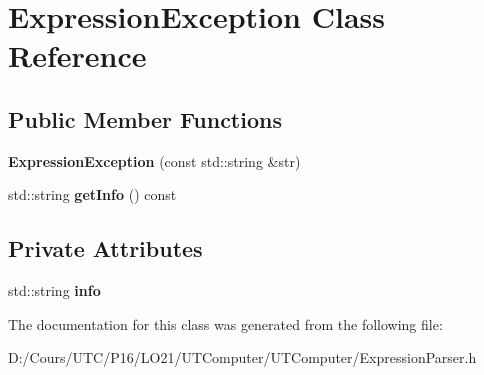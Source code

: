 \hypertarget{class_expression_exception}{}\section{Expression\+Exception Class Reference}
\label{class_expression_exception}
\subsection*{Public Member Functions}
\begin{DoxyCompactItemize}
\item 
{\bfseries Expression\+Exception} (const std\+::string \&str)\hypertarget{class_expression_exception_a89fc0c8e0f4c04c79c3e203c55a339d6}{}\label{class_expression_exception_a89fc0c8e0f4c04c79c3e203c55a339d6}

\item 
std\+::string {\bfseries get\+Info} () const \hypertarget{class_expression_exception_aacd4d220c3df5d06ce0e69db911bb9bf}{}\label{class_expression_exception_aacd4d220c3df5d06ce0e69db911bb9bf}

\end{DoxyCompactItemize}
\subsection*{Private Attributes}
\begin{DoxyCompactItemize}
\item 
std\+::string {\bfseries info}\hypertarget{class_expression_exception_aff6034fd07cd465c99c35e65dba94dfa}{}\label{class_expression_exception_aff6034fd07cd465c99c35e65dba94dfa}

\end{DoxyCompactItemize}


The documentation for this class was generated from the following file\+:\begin{DoxyCompactItemize}
\item 
D\+:/\+Cours/\+U\+T\+C/\+P16/\+L\+O21/\+U\+T\+Computer/\+U\+T\+Computer/Expression\+Parser.\+h\end{DoxyCompactItemize}
